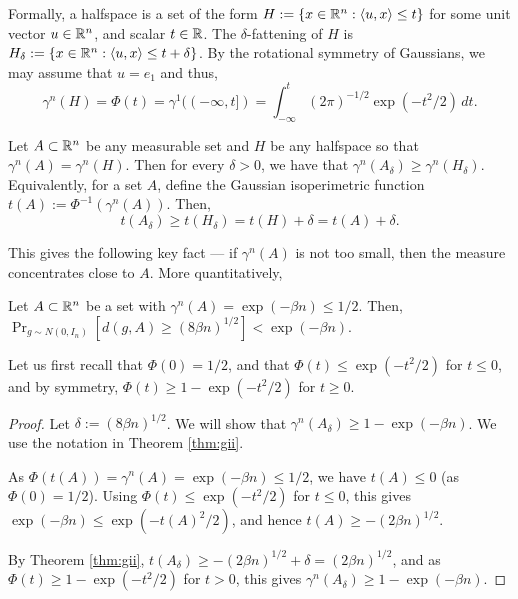 Formally, a halfspace is a set of the form $H:= \{x \in \mathbb{R}^n: \langle u,x\rangle \leq t\}$ for some unit vector $u \in \mathbb{R}^n$, and scalar $t\in \mathbb{R}$. The $\delta$-fattening of $H$ is $H_\delta:= \{x \in \mathbb{R}^n: \langle u,x\rangle \leq t+\delta\}$. By the rotational symmetry of Gaussians, we may assume that $u=e_1$ and thus,  
\[\gamma^n(H) = \Phi(t) = \gamma^1((-\infty,t]) = \int_{-\infty}^t (2\pi)^{-1/2} \exp(-t^2/2) \,dt.\] 

\begin{theorem}[GI Inequality]
\label{thm:gii}
    Let $A \subset \mathbb{R}^n$ be any measurable set and $H$ be any halfspace so that $\gamma^n(A) = \gamma^n(H)$. Then for every $\delta>0$, we have that  $\gamma^n(A_\delta) \geq  \gamma^n(H_\delta)$.
Equivalently,
for a set $A$, define the Gaussian isoperimetric function $t(A) := \Phi^{-1}(\gamma^n(A))$. 
Then, \[t(A_\delta) \geq t(H_\delta) = t(H)+\delta = t(A) + \delta.\]
\end{theorem}
This gives the following key fact --- if $\gamma^n(A)$ is not too small, then the measure concentrates close to $A$.
More quantitatively,

\begin{lemma} %
 \label{lm:ch4:measure-conc}
 Let $A\subset \mathbb{R}^n$ be a set with $\gamma^n(A) = \exp(-\beta n) \leq 1/2$. Then,
   $\Pr_{g\sim N(0,I_n)}[d(g,A) \geq  (8\beta n)^{1/2} ] < \exp(-\beta n)$.
\end{lemma}  
Let us first recall that $\Phi(0)=1/2$, and that  $\Phi(t) \leq \exp(-t^2/2)$ for $t \leq 0$, and by symmetry,  $\Phi(t) \geq 1- \exp(-t^2/2)$ for $t \geq 0$.

   \begin{proof}
Let $\delta := (8\beta n)^{1/2}$. 
We will show that $\gamma^n(A_\delta) \geq 1- \exp(-\beta n)$.
We use the notation in Theorem \ref{thm:gii}.

As $\Phi(t(A)) =\gamma^n(A) =\exp(-\beta n)\leq 1/2$, we have $t(A) \leq 0$ (as $\Phi(0)=1/2$). Using $\Phi(t) \leq \exp(-t^2/2)$ for $t \leq 0$, this gives $\exp(-\beta n) \leq \exp(-t(A)^2/2)$, and hence $t(A) \geq -(2\beta n)^{1/2}$.

By Theorem \ref{thm:gii}, $t(A_\delta) \geq -(2\beta n)^{1/2} + \delta = (2\beta n)^{1/2}$, and as $\Phi(t) \geq 1-\exp(-t^2/2)$ for $t>0$, this gives 
$\gamma^n(A_\delta) \geq 1- \exp(-\beta n)$.
\end{proof}


